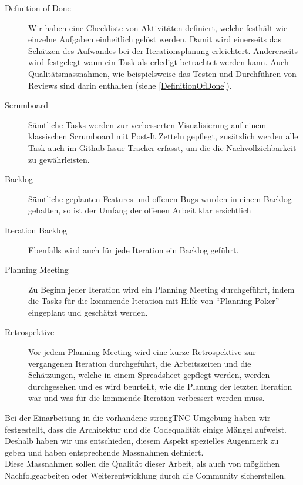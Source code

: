 \begin{description}
	\item[Definition of Done] Wir haben eine Checkliste von Aktivitäten	definiert,
	welche festhält wie einzelne Aufgaben einheitlich gelöst werden. Damit wird
	einerseits das Schätzen des Aufwandes bei der Iterationsplanung erleichtert.
	Andererseits wird festgelegt wann ein Task als erledigt betrachtet werden kann.
	Auch Qualitätsmassnahmen, wie beispielsweise das Testen und Durchführen von
	Reviews sind darin enthalten (siehe \autoref{DefinitionOfDone}).

	\item[Scrumboard] Sämtliche Tasks werden zur verbesserten Visualisierung auf
	einem klassischen Scrumboard mit Post-It Zetteln gepflegt, zusätzlich werden
	alle Task auch im Github Issue Tracker erfasst, um die die Nachvollziehbarkeit
	zu gewährleisten.
	
	\item[Backlog] Sämtliche geplanten Features und offenen Bugs wurden in einem
	Backlog gehalten, so ist der Umfang der offenen Arbeit klar ersichtlich
	
	\item[Iteration Backlog] Ebenfalls wird auch für jede Iteration ein Backlog
	geführt.
	
	\item[Planning Meeting] Zu Beginn jeder Iteration wird ein Planning Meeting
	durchgeführt, indem die Tasks für die kommende Iteration mit Hilfe von
	\enquote{Planning Poker} eingeplant und geschätzt werden.
		
	\item[Retrospektive] Vor jedem Planning Meeting wird eine kurze Retrospektive
	zur vergangenen Iteration durchgeführt, die Arbeitszeiten und die Schätzungen,
	welche in einem Spreadsheet gepflegt werden, werden durchgesehen und es wird
	beurteilt, wie die Planung der letzten Iteration war und was für die kommende
	Iteration verbessert werden muss.
	
\end{description}

Bei der Einarbeitung in die vorhandene strongTNC Umgebung haben wir
festgestellt, dass die Architektur und die Codequalität einige Mängel aufweist.
Deshalb haben wir uns entschieden, diesem Aspekt spezielles Augenmerk zu geben
und haben entsprechende Massnahmen definiert.\\ 
Diese Massnahmen sollen die Qualität dieser Arbeit, als auch von möglichen
Nachfolgearbeiten oder Weiterentwicklung durch die Community sicherstellen.

